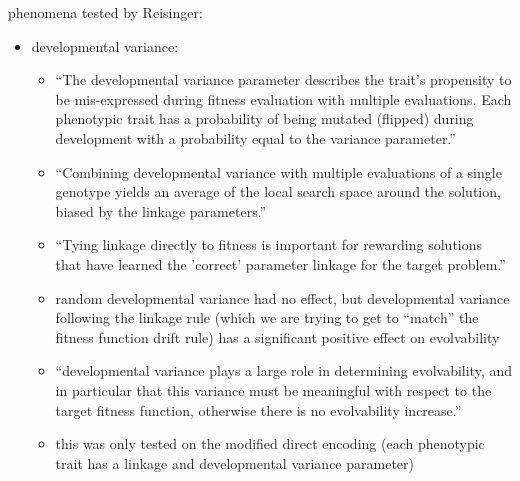 phenomena tested by Reisinger:
\begin{itemize}
  \item developmental variance: 
  \begin{itemize}
    \item ``The developmental variance parameter describes the trait's propensity to be mis-expressed during fitness evaluation with multiple evaluations. Each phenotypic trait has a probability of being mutated (flipped) during development with a probability equal to the variance parameter.'' \cite{Reisinger2005TowardsEvolvability}
    \item ``Combining developmental variance with multiple evaluations of a single genotype yields an average of the local search space around the solution, biased by the linkage parameters.'' \cite{Reisinger2005TowardsEvolvability}
    \item ``Tying linkage directly to fitness is important for rewarding solutions that have learned the 'correct' parameter linkage for the target problem.'' \cite{Reisinger2005TowardsEvolvability}
    \item random developmental variance had no effect, but developmental variance following the linkage rule (which we are trying to get to ``match'' the fitness function drift rule) has a significant positive effect on evolvability
    \item ``developmental variance plays a large role in determining evolvability, and in particular that this variance must be meaningful with respect to the target fitness function, otherwise there is no evolvability increase.'' \cite{Reisinger2005TowardsEvolvability}
    \item this was only tested on the modified direct encoding (each phenotypic trait has a linkage and developmental variance parameter)
  \end{itemize}
\end{itemize}

